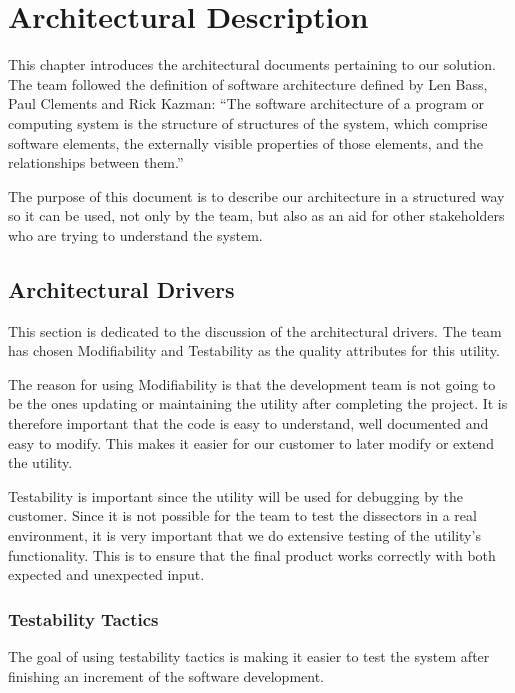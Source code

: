 \chapter{Architectural Description}
This chapter introduces the architectural documents pertaining to our solution. The team followed the definition of software architecture defined by Len Bass, Paul Clements and Rick Kazman: ``The software architecture of a program or computing
system is the structure of structures of the system, which comprise software elements, the externally visible properties of those elements, and the relationships between them.''~\cite[p.3]{Bass2003}

The purpose of this document is to describe our architecture in a structured way so it can be used, not only by the team, but also as an aid for other stakeholders who are trying to understand the system.

\section{Architectural Drivers}
This section is dedicated to the discussion of the architectural drivers.
The team has chosen Modifiability and Testability as the quality attributes for this \gls{utility}. 

The reason for using Modifiability is that the development team is not going to be the ones updating or maintaining the \gls{utility} after completing the project. It is therefore important that the code is easy to understand, well documented and easy to modify. This makes it easier for our customer to later modify or extend the \gls{utility}.

Testability is important since the \gls{utility} will be used for debugging by the customer.  Since it is not possible for the team to test the \glspl{dissector} in a real environment, it is very important that we do extensive testing of the utility's functionality. This is to ensure that the final product works correctly with both expected and unexpected input.

\subsection{Testability Tactics}
The goal of using testability tactics is making it easier to test the system after finishing an increment of the software development. 

